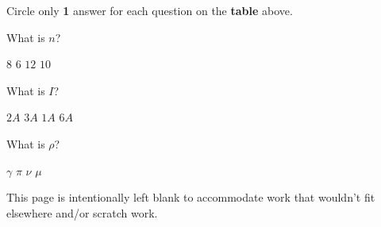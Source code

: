 \documentclass[letterpaper,12pt,addpoints]{exam}
\begin{document}
\medskip
\noindent
\begin{description}
\item Circle only \textbf{1} answer for each question on the \textbf{table} above. \\
\end{description}
\clearpage

\begin{questions}

\question What is $n$?

\begin{oneparchoices}
\choice $8$ 
\CorrectChoice $6$
\choice $12$ 
\choice $10$ 
\end{oneparchoices}

\question What is $I$?

\begin{oneparchoices}
\choice $2A$
\choice $3A$ 
\CorrectChoice $1A$ 
\choice $6A$ 
\end{oneparchoices}

\question What is $\rho$?

\begin{oneparchoices}
\choice $\gamma$
\choice $\pi$ 
\choice $\nu$ 
\CorrectChoice $\mu$ 
\end{oneparchoices}

\end{questions}

\clearpage
This page is intentionally left blank to accommodate work that wouldn't fit elsewhere and/or scratch work.
\end{document}
